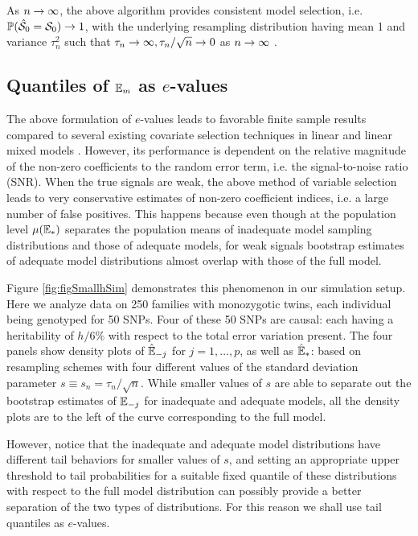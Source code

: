 \noindent As $n \rightarrow \infty$, the above algorithm provides consistent model selection, i.e. ${\mathbb{P}} ( \hat {{\cal{S}}}_0 = {\cal{S}}_0) \rightarrow 1$, with the underlying resampling distribution having mean 1 and variance $\tau_n^2$ such that $\tau_n \rightarrow \infty, \tau_n/\sqrt n \rightarrow 0$ as $n \rightarrow \infty$ \citep{MajumdarChatterjee17}.

\subsection{Quantiles of ${\mathbb{E}}_{m }$ as $e$-values}
The above formulation of $e$-values leads to favorable finite sample results compared to several existing covariate selection techniques in linear and linear mixed models \citep{MajumdarChatterjee17}. However, its performance is dependent on the relative magnitude of the non-zero coefficients to the random error term, i.e. the signal-to-noise ratio (SNR). When the true signals are weak, the above method of variable selection leads to very conservative estimates of non-zero coefficient indices, i.e. a large number of false positives. This happens because even though at the population level $\mu ({\mathbb{E}}_{* })$ separates the population means of inadequate model sampling distributions and those of adequate models, for weak signals bootstrap estimates of adequate model distributions almost overlap with those of the full model.

Figure \ref{fig:figSmallhSim} demonstrates this phenomenon in our simulation setup. Here we analyze data on 250 families with monozygotic twins, each individual being genotyped for 50 SNPs. Four of these 50 SNPs are causal: each having a heritability of $h/6\%$ with respect to the total error variation present. The four panels show density plots of $\hat {{\mathbb{E}}}_{-j}$ for $j = 1, \ldots, p$, as well as $\hat {{\mathbb{E}}}_{* }$: based on resampling schemes with four different values of the standard deviation parameter $s \equiv s_n = \tau_n / \sqrt n $. While smaller values of $s$ are able to separate out the bootstrap estimates of ${\mathbb{E}}_{-j}$ for inadequate and adequate models, all the density plots are to the left of the curve corresponding to the full model.

However, notice that the inadequate and adequate model distributions have different tail behaviors for smaller values of $s$, and setting an appropriate upper threshold to tail probabilities for a suitable fixed quantile of these distributions with respect to the full model distribution can possibly provide a better separation of the two types of distributions. For this reason we shall use tail quantiles as $e$-values.

